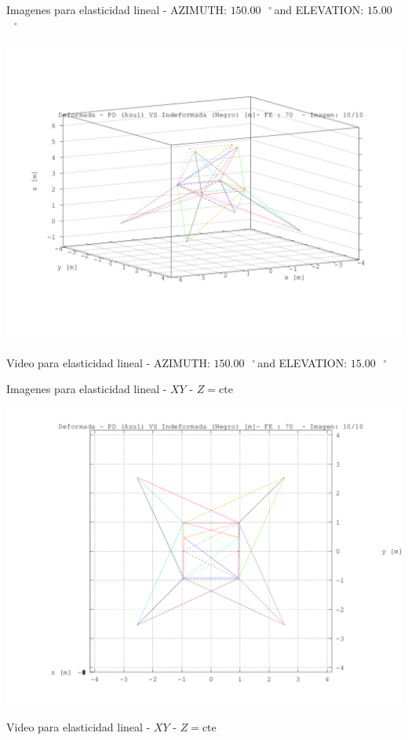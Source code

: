 \documentclass[a4paper,11pt]{article}
\newcommand{\grad}{\hspace{-2.5mm}$\,\phantom{a}^{\circ}\,$}
\begin{document}
\newpage       

\newpage       
\begin{center}       
Imagenes para elasticidad lineal - AZIMUTH: $150.00$\grad and ELEVATION: $ 15.00$\grad

\includegraphics[width=.80\textwidth]{../../deformada/torre_deformada_10.png}      

Video para elasticidad lineal - AZIMUTH: $150.00$\grad and ELEVATION: $ 15.00$\grad


\end{center}       
\newpage       
\begin{center}       
Imagenes para elasticidad lineal -  $XY$ - $Z=\text{cte}$ 

\includegraphics[width=.80\textwidth]{../../XY_XZ_YZ/XY/deformada/torre_deformada_XY_10.png}      


Video para elasticidad lineal -  $XY$ - $Z=\text{cte}$ 


\end{center}       
\end{document}
